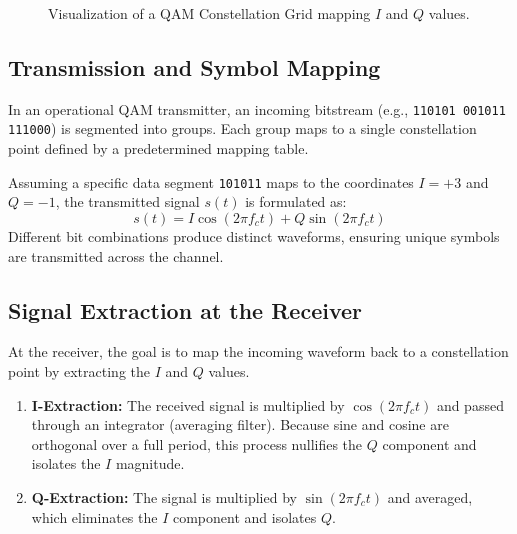 \documentclass[10pt, conference]{IEEEtran}
\begin{document}
\begin{figure}[h]
\centering
{}
\caption{Visualization of a QAM Constellation Grid mapping $I$ and $Q$ values.}
\label{fig:qam_constellation}
\end{figure}

\subsection{\textbf{Transmission and Symbol Mapping}}
In an operational QAM transmitter, an incoming bitstream (e.g., \texttt{110101 001011 111000}) is segmented into groups. Each group maps to a single constellation point defined by a predetermined mapping table. 

Assuming a specific data segment \texttt{101011} maps to the coordinates $I = +3$ and $Q = -1$, the transmitted signal $s(t)$ is formulated as:
\begin{equation}
    s(t) = I \cos(2\pi f_c t) + Q \sin(2\pi f_c t)
\end{equation}
Different bit combinations produce distinct waveforms, ensuring unique symbols are transmitted across the channel.


\subsection{\textbf{Signal Extraction at the Receiver}}
At the receiver, the goal is to map the incoming waveform back to a constellation point by extracting the $I$ and $Q$ values.

\begin{enumerate}
    \item \textbf{I-Extraction:} The received signal is multiplied by $\cos(2\pi f_c t)$ and passed through an integrator (averaging filter). Because sine and cosine are orthogonal over a full period, this process nullifies the $Q$ component and isolates the $I$ magnitude.
    \item \textbf{Q-Extraction:} The signal is multiplied by $\sin(2\pi f_c t)$ and averaged, which eliminates the $I$ component and isolates $Q$.
\end{enumerate}
\end{document}
